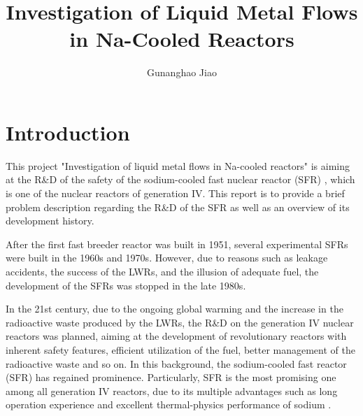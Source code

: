 \documentclass{article}
\title{Investigation of Liquid Metal Flows in Na-Cooled Reactors}
\author{Gunanghao Jiao}
\begin{document}
\maketitle


\section{Introduction}
This project "Investigation of liquid metal flows in Na-cooled reactors" is aiming at the R\&D of the safety of the sodium-cooled fast nuclear reactor (SFR)%
, which is one of the nuclear reactors of generation IV. This report is to provide a brief problem description regarding the R\&D of the SFR as well as an overview of its development history. %

After the first fast breeder reactor was built in 1951, several experimental SFRs were built in the 1960s and 1970s. However, due to reasons such as leakage accidents, the success of the LWRs, and the illusion of adequate fuel, the development of the SFRs was stopped in the late 1980s. \cite{chengSafetySodiumCooledFast2021}

In the 21st century, due to the ongoing global warming and the increase in the radioactive waste produced by the LWRs, the R\&D on the generation IV nuclear reactors was planned, aiming at the development of revolutionary reactors with inherent safety features, efficient utilization of the fuel, better management of the radioactive waste and so on. In this background, the sodium-cooled fast reactor (SFR) has regained prominence. Particularly, SFR is the most promising one among all generation IV reactors, due to its multiple advantages such as long operation experience and excellent thermal-physics performance of sodium \cite{ chengSafetySodiumCooledFast2021, TechnologyRoadmapUpdate, schulenbergFourthGenerationNuclear2022}.
\end{document}
